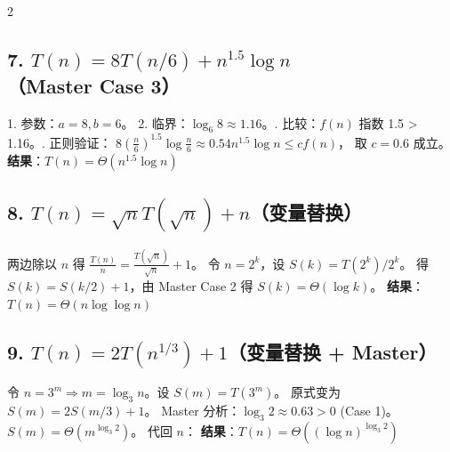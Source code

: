 \documentclass[10pt, a4paper]{article}
\begin{document}
\begin{multicols*}{2}
\vspace{12pt}
\subsection{7. $T(n)=8T(n/6)+n^{1.5}\log n$（Master Case 3）}
1. 参数：$a=8, b=6$。
2. 临界：$\log_6 8 \approx 1.16$。. 比较：$f(n)$ 指数 1.5 > 1.16。. 正则验证：
$ 8(\frac{n}{6})^{1.5}\log \frac{n}{6} \approx 0.54 n^{1.5}\log n \le c f(n) $，
取 $c=0.6$ 成立。\newline
\textbf{结果}：$T(n) = \Theta(n^{1.5} \log n)$

\vspace{12pt}
\subsection{8. $T(n)=\sqrt{n}T(\sqrt{n})+n$（变量替换）}
两边除以 $n$ 得 $\frac{T(n)}{n} = \frac{T(\sqrt{n})}{\sqrt{n}} + 1$。\newline
令 $n=2^k$，设 $S(k) = T(2^k)/2^k$。\newline
得 $S(k) = S(k/2) + 1$，由 Master Case 2 得 $S(k) = \Theta(\log k)$。\newline
\textbf{结果}：$T(n) = \Theta(n \log \log n)$

\vspace{12pt}
\subsection{9. $T(n)=2T(n^{1/3})+1$（变量替换 + Master）}
令 $n=3^m \Rightarrow m=\log_3 n$。设 $S(m) = T(3^m)$。
原式变为 $S(m) = 2S(m/3) + 1$。
Master 分析：$\log_3 2 \approx 0.63 > 0$ (Case 1)。
$S(m) = \Theta(m^{\log_3 2})$。
代回 $n$：\newline
\textbf{结果}：$T(n) = \Theta((\log n)^{\log_3 2})$

\end{multicols*}
\end{document}
